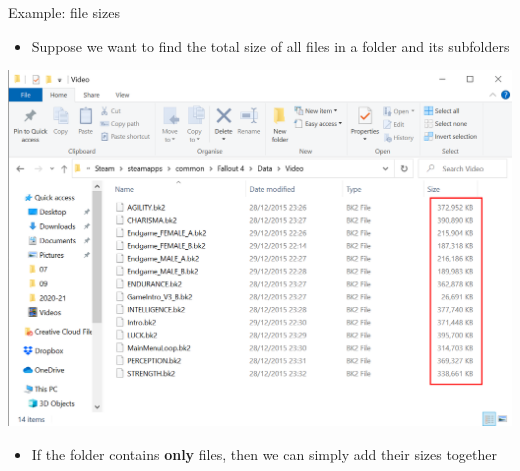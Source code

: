 \begin{frame}{Example: file sizes}
    \begin{itemize}
        \pause\item Suppose we want to find the total size of all files in a folder and its subfolders
    \end{itemize}
    \pause
    \begin{center}
        \includegraphics[height=0.5\textheight]{filesizes_1}
    \end{center}
    \begin{itemize}
        \item If the folder contains \textbf{only} files, then we can simply add their sizes together
    \end{itemize}
\end{frame}

